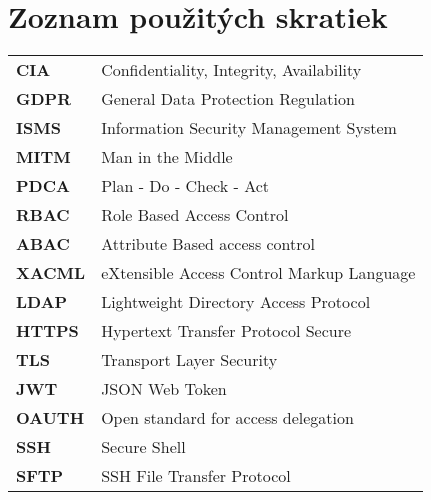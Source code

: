 \thispagestyle{plain}

\section*{\Huge Zoznam použitých skratiek}
\vskip 1cm

\begin{tabular}{ >{\bfseries}m{2cm} m{10cm} }
CIA		& Confidentiality, Integrity, Availability \\
GDPR    & General Data Protection Regulation \\
ISMS    & Information Security Management System \\
MITM    & Man in the Middle\\
PDCA    & Plan - Do - Check - Act\\
RBAC    & Role Based Access Control\\
ABAC    & Attribute Based access control\\
XACML   & eXtensible Access Control Markup Language\\
LDAP    & Lightweight Directory Access Protocol\\
HTTPS   & Hypertext Transfer Protocol Secure\\
TLS     & Transport Layer Security\\
JWT     & JSON Web Token\\
OAUTH   & Open standard for access delegation\\
SSH     & Secure Shell\\
SFTP    & SSH File Transfer Protocol\\
\end{tabular}

\emptypage
